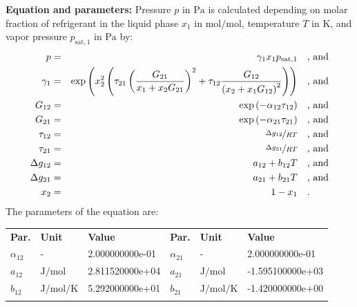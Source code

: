 \textbf{Equation and parameters:}
\newline
%
Pressure $p$ in $\si{\pascal}$ is calculated depending on molar fraction of refrigerant in the liquid phase $x_1$ in $\si{\mole\per\mole}$, temperature $T$ in $\si{\kelvin}$, and vapor pressure $p_\mathrm{sat,1}$ in $\si{\pascal}$ by:
%
\begin{equation*}
\begin{split}
p &=& \gamma_1 x_1 p_\mathrm{sat,1} & \quad\text{, and} \\
\gamma_1 &=& \exp \left( x_2^2 \left( \tau_{21} \left( \frac{G_{21}}{x_1 + x_2 G_{21}} \right) ^2 + \tau_{12} \frac{G_{12}}{\left( x_2 + x_1 G_{12} \right) ^2}\right) \right) & \quad\text{, and} \\
G_{12} &=& \exp \left( -\alpha_{12} \tau_{12} \right) & \quad\text{, and} \\
G_{21} &=& \exp \left( -\alpha_{21} \tau_{21} \right) & \quad\text{, and} \\
\tau_{12} &=& \nicefrac{\Delta g_{12}}{R T} & \quad\text{, and} \\
\tau_{21} &=& \nicefrac{\Delta g_{21}}{R T} & \quad\text{, and} \\
\Delta g_{12} &=& a_{12} + b_{12} T & \quad\text{, and} \\
\Delta g_{21} &=& a_{21} + b_{21} T & \quad\text{, and} \\
x_2 &=& 1 - x_1  & \quad\text{.} \\
\end{split}
\end{equation*}
%
The parameters of the equation are:
%
\begin{longtable}[l]{lll|lll}
\toprule
\addlinespace
\textbf{Par.} & \textbf{Unit} & \textbf{Value} &	\textbf{Par.} & \textbf{Unit} & \textbf{Value} \\
\addlinespace
\midrule
\endhead

\bottomrule
\endfoot
\bottomrule
\endlastfoot
\addlinespace

$\alpha_{12}$ & - & 2.000000000e-01 & $\alpha_{21}$ & - & 2.000000000e-01 \\
$a_{12}$ & $\si{\joule\per\mole}$ & 2.811520000e+04 & $a_{21}$ & $\si{\joule\per\mole}$ & -1.595100000e+03 \\
$b_{12}$ & $\si{\joule\per\mole\per\kelvin}$ & 5.292000000e+01 & $b_{21}$ & $\si{\joule\per\mole\per\kelvin}$ & -1.420000000e+00 \\

\addlinespace\end{longtable}

